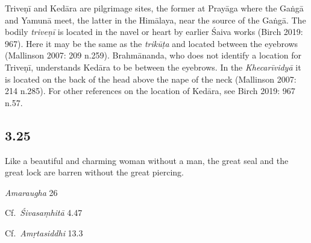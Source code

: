 \begin{ekdosis}
\begin{philcomm}[hp03_024]
Triveṇī and Kedāra are pilgrimage sites, the former at Prayāga where the Gaṅgā and Yamunā meet, the latter in the Himālaya, near the source of the Gaṅgā. The bodily \emph{triveṇī} is located in the navel or heart by earlier Śaiva works (Birch 2019: 967). Here it may be the same as the \emph{trikūṭa} and located between the eyebrows (Mallinson 2007: 209 n.259). Brahmānanda, who does not identify a location for Triveṇī, understands Kedāra to be between the eyebrows. In the \emph{Khecarīvidyā} it is located on the back of the head above the nape of the neck (Mallinson 2007: 214 n.285). For other references on the location of Kedāra, see Birch 2019: 967 n.57.
\end{philcomm}

\subsection*{3.25}
\begin{translation}[hp03_025]
Like a beautiful and charming woman without a man, the great seal and the great lock are barren without the great piercing.\\
\end{translation}

\begin{sources}[hp03_025]
\emph{Amaraugha} 26
\begin{versinnote}
\tl{\var{°bandhau niṣphalau vedhavarjitau ] °bandho niṣphalo vedhavarjitaḥ \vl}\\!}
\end{versinnote}

Cf.~\emph{Śivasaṃhitā} 4.47
\begin{versinnote}
\end{versinnote}

Cf.~\emph{Amṛtasiddhi} 13.3
\begin{versinnote}
\end{versinnote}
\end{sources}


\end{ekdosis}
